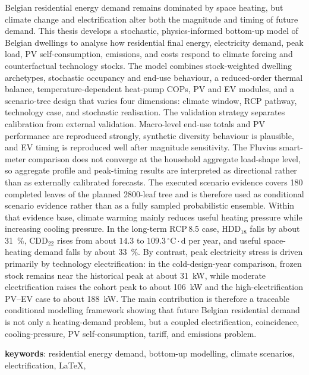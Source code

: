Belgian residential energy demand remains dominated by space heating, but climate change and electrification alter both the magnitude and timing of future demand. This thesis develops a stochastic, physics-informed bottom-up model of Belgian dwellings to analyse how residential final energy, electricity demand, peak load, PV self-consumption, emissions, and costs respond to climate forcing and counterfactual technology stocks. The model combines stock-weighted dwelling archetypes, stochastic occupancy and end-use behaviour, a reduced-order thermal balance, temperature-dependent heat-pump COPs, PV and EV modules, and a scenario-tree design that varies four dimensions: climate window, RCP pathway, technology case, and stochastic realisation.
\newline The validation strategy separates calibration from external validation. Macro-level end-use totals and PV performance are reproduced strongly, synthetic diversity behaviour is plausible, and EV timing is reproduced well after magnitude sensitivity. The Fluvius smart-meter comparison does not converge at the household aggregate load-shape level, so aggregate profile and peak-timing results are interpreted as directional rather than as externally calibrated forecasts. The executed scenario evidence covers 180 completed leaves of the planned 2800-leaf tree and is therefore used as conditional scenario evidence rather than as a fully sampled probabilistic ensemble.
\newline Within that evidence base, climate warming mainly reduces useful heating pressure while increasing cooling pressure. In the long-term RCP\,8.5 case, HDD$_{18}$ falls by about \SI{31}{\percent}, CDD$_{22}$ rises from about $14.3$ to $109.3\,^{\circ}\mathrm{C}\cdot\mathrm{d}$ per year, and useful space-heating demand falls by about \SI{33}{\percent}. By contrast, peak electricity stress is driven primarily by technology electrification: in the cold-design-year comparison, frozen stock remains near the historical peak at about \SI{31}{kW}, while moderate electrification raises the cohort peak to about \SI{106}{kW} and the high-electrification PV--EV case to about \SI{188}{kW}. The main contribution is therefore a traceable conditional modelling framework showing that future Belgian residential demand is not only a heating-demand problem, but a coupled electrification, coincidence, cooling-pressure, PV self-consumption, tariff, and emissions problem.

\bigskip
\textbf{keywords}: residential energy demand, bottom-up modelling, climate scenarios, electrification, \LaTeX, \TikZ


